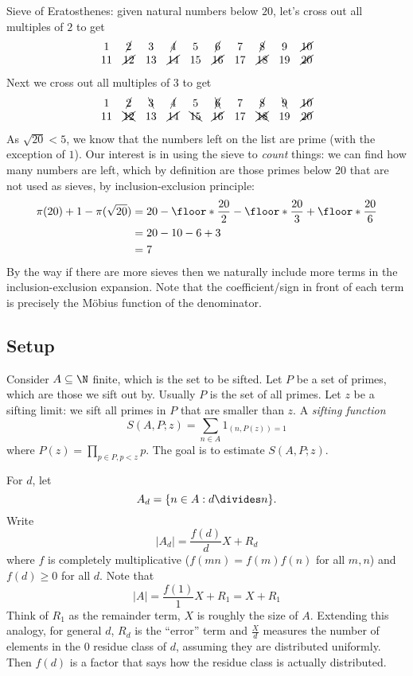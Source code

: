 \documentclass[a4paper]{article}
\begin{document}
Sieve of Eratosthenes: given natural numbers below \(20\), let's cross out all multiples of \(2\) to get
\[
  \begin{array}{cccccccccc}
    1 & \cancel 2 & 3 & \cancel 4 & 5 & \cancel 6 & 7 & \cancel 8 & 9 & \cancel{10} \\
    11 & \cancel{12} & 13 & \cancel{14} & 15 & \cancel{16} & 17 & \cancel{18} & 19 & \cancel{20}
  \end{array}
\]
Next we cross out all multiples of \(3\) to get
\[
  \begin{array}{cccccccccc}
    1 & \cancel 2 & \bcancel 3 & \cancel 4 & 5 & \xcancel 6 & 7 & \cancel 8 & \bcancel 9 & \cancel{10} \\
    11 & \xcancel{12} & 13 & \cancel{14} & \bcancel{15} & \cancel{16} & 17 & \xcancel{18} & 19 & \cancel{20}
  \end{array}
\]
As \(\sqrt{20} < 5\), we know that the numbers left on the list are prime (with the exception of \(1\)). Our interest is in using the sieve to \emph{count} things: we can find how many numbers are left, which by definition are those primes below \(20\) that are not used as sieves, by inclusion-exclusion principle:
\begin{align*}
  \pi(20) + 1 - \pi(\sqrt{20})
  &= 20 - \floor*{\frac{20}{2}} - \floor*{\frac{20}{3}} + \floor*{\frac{20}{6}} \\
  &= 20 - 10 - 6 + 3 \\
  &= 7 
\end{align*}
By the way if there are more sieves then we naturally include more terms in the inclusion-exclusion expansion. Note that the coefficient/sign in front of each term is precisely the Möbius function of the denominator.

\subsection{Setup}

Consider \(A \subseteq \N\) finite, which is the set to be sifted. Let \(P\) be a set of primes, which are those we sift out by. Usually \(P\) is the set of all primes. Let \(z\) be a sifting limit: we sift all primes in \(P\) that are smaller than \(z\). A \emph{sifting function}
\[
  S(A, P; z) = \sum_{n \in A} 1_{(n, P(z)) = 1}
\]
where \(P(z) = \prod_{p \in P, p < z} p\). The goal is to estimate \(S(A, P; z)\).

For \(d\), let
\[
  A_d = \{n \in A: d \divides n\}.
\]
Write
\[
  |A_d| = \frac{f(d)}{d} X + R_d
\]
where \(f\) is completely multiplicative (\(f(mn) = f(m)f(n)\) for all \(m, n\)) and \(f(d) \geq 0\) for all \(d\). Note that
\[
  |A| = \frac{f(1)}{1} X + R_1 = X + R_1
\]
Think of \(R_1\) as the remainder term, \(X\) is roughly the size of \(A\). Extending this analogy, for general \(d\), \(R_d\) is the ``error'' term and \(\frac{X}{d}\) measures the number of elements in the \(0\) residue class of \(d\), assuming they are distributed uniformly. Then \(f(d)\) is a factor that says how the residue class is actually distributed.
\end{document}
